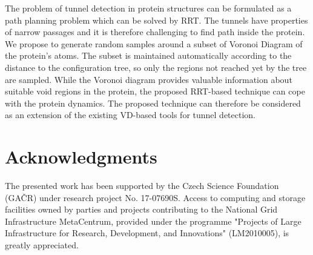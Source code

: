\documentclass{llncs}
\begin{document}
The problem of tunnel detection in protein structures can be formulated as a path planning problem which can be solved by RRT.
The tunnels have properties of narrow passages and it is therefore challenging to find path inside the protein.
We propose to generate random samples around a subset of Voronoi Diagram of the protein's atoms.
The subset is maintained automatically according to the distance to the configuration tree, so only the regions not reached yet
by the tree are sampled.
While the Voronoi diagram provides valuable information about suitable void regions in the protein, the
proposed RRT-based technique can cope with the protein dynamics.
The proposed technique can therefore be considered as an extension of the existing VD-based tools for tunnel detection.

\section{Acknowledgments}

The presented work has been supported by the Czech Science Foundation (GA{\v C}R) under research project No. 17-07690S.
Access to computing and storage facilities owned by parties and projects contributing to the National Grid Infrastructure MetaCentrum, provided under the programme "Projects of Large Infrastructure for Research, Development, and Innovations" (LM2010005), is greatly appreciated.




\end{document}
